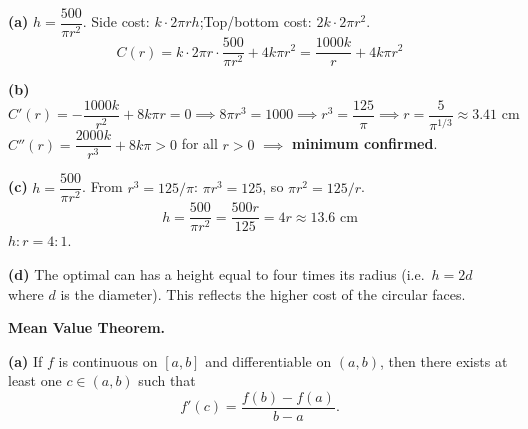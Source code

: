 \documentclass[addpoints]{exam}
\begin{document}
\begin{questions}
\begin{solution}[9cm]
\textbf{(a)} $h = \dfrac{500}{\pi r^2}$.\quad
Side cost: $k \cdot 2\pi r h$;\quad Top/bottom cost: $2k \cdot 2\pi r^2$.
\[
C(r) = k \cdot 2\pi r \cdot \frac{500}{\pi r^2} + 4k\pi r^2 = \frac{1000k}{r} + 4k\pi r^2
\]

\textbf{(b)}
\[
C'(r) = -\frac{1000k}{r^2} + 8k\pi r = 0 \implies 8\pi r^3 = 1000
\implies r^3 = \frac{125}{\pi} \implies r = \frac{5}{\pi^{1/3}} \approx 3.41 \text{ cm}
\]
$C''(r) = \dfrac{2000k}{r^3} + 8k\pi > 0$ for all $r > 0$ $\implies$ \textbf{minimum confirmed}.

\textbf{(c)} $h = \dfrac{500}{\pi r^2}$. From $r^3 = 125/\pi$: $\pi r^3 = 125$, so
$\pi r^2 = 125/r$.
\[
h = \frac{500}{\pi r^2} = \frac{500r}{125} = 4r \approx 13.6 \text{ cm}
\]
$h\!:\!r = 4\!:\!1$.

\textbf{(d)} The optimal can has a height equal to four times its radius (i.e.\ $h = 2d$
where $d$ is the diameter). This reflects the higher cost of the circular faces.
\end{solution}

\question \textbf{Mean Value Theorem.}
\begin{solution}[8cm]
\textbf{(a)} If $f$ is continuous on $[a,b]$ and differentiable on $(a,b)$, then there
exists at least one $c \in (a,b)$ such that
\[f'(c) = \frac{f(b) - f(a)}{b - a}.\]


\end{solution}
\end{questions}
\end{document}
